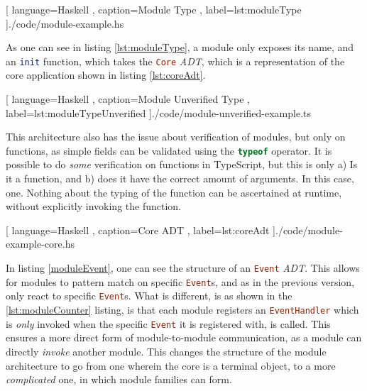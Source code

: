 \begin{center}
  
   [ language=Haskell
   , caption={Module Type}
   , label=lst:moduleType
   ]{./code/module-example.hs}
\end{center}

As one can see in listing \ref{lst:moduleType}, a module only exposes its name,
and an \lstinline[language=haskell]{init} function, which takes the
\lstinline[language=haskell]{Core} \textit{ADT}, which is a representation of
the core application shown in listing \ref{lst:coreAdt}.

\begin{center}
  
   [ language=Haskell
   , caption={Module Unverified Type}
   , label=lst:moduleTypeUnverified
   ]{./code/module-unverified-example.ts}
\end{center}

This architecture also has the issue about verification of modules, but only on
functions, as simple fields can be validated using the
\lstinline[language=JavaScript]{typeof} operator. It is possible to do
\textit{some} verification on functions in TypeScript, but this is only a) Is it
a function, and b) does it have the correct amount of arguments. In this case,
one. Nothing about the typing of the function can be ascertained at runtime,
without explicitly invoking the function.

\begin{center}
  
    [ language=Haskell
    , caption={Core ADT}
    , label=lst:coreAdt
    ]{./code/module-example-core.hs}
\end{center}

In listing \ref{moduleEvent}, one can see the structure of an
\lstinline[language=Haskell]{Event} \textit{ADT}. This allows for modules to
pattern match on specific \lstinline[language=Haskell]{Event}s, and as in the
previous version, only react to specific \lstinline[language=Haskell]{Event}s.
What is different, is as shown in the \ref{lst:moduleCounter} listing, is that
each module registers an \lstinline[language=Haskell]{EventHandler} which is
\textit{only} invoked when the specific \lstinline[language=Haskell]{Event} it
is registered with, is called. This ensures a more direct form of
module-to-module communication, as a module can directly \textit{invoke} another
module. This changes the structure of the module architecture to go from one
wherein the core is a terminal object, to a more \textit{complicated} one, in
which module families can form.

